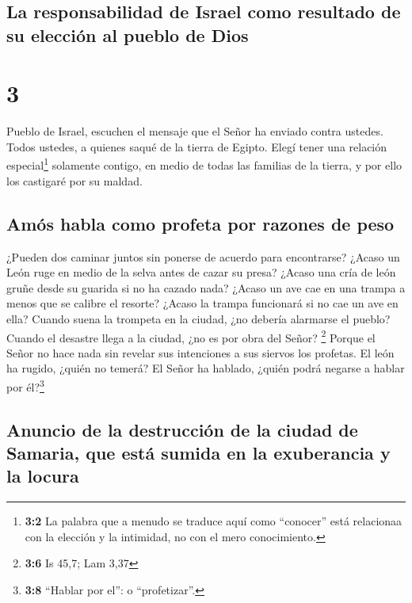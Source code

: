 \hypertarget{la-responsabilidad-de-israel-como-resultado-de-su-elecciuxf3n-al-pueblo-de-dios}{%
\subsection{La responsabilidad de Israel como resultado de su elección
al pueblo de
Dios}\label{la-responsabilidad-de-israel-como-resultado-de-su-elecciuxf3n-al-pueblo-de-dios}}

\hypertarget{section-2}{%
\section{3}\label{section-2}}

 Pueblo de Israel, escuchen el mensaje que el Señor ha
enviado contra ustedes. Todos ustedes, a quienes saqué de la tierra de
Egipto.  Elegí tener una relación especial\footnote{\textbf{3:2}
  La palabra que a menudo se traduce aquí como ``conocer'' está
  relacionaa con la elección y la intimidad, no con el mero
  conocimiento.} solamente contigo, en medio de todas las familias de la
tierra, y por ello los castigaré por su maldad.

\hypertarget{amuxf3s-habla-como-profeta-por-razones-de-peso}{%
\subsection{Amós habla como profeta por razones de
peso}\label{amuxf3s-habla-como-profeta-por-razones-de-peso}}

 ¿Pueden dos caminar juntos sin ponerse de acuerdo para
encontrarse?  ¿Acaso un León ruge en medio de la selva
antes de cazar su presa? ¿Acaso una cría de león gruñe desde su guarida
si no ha cazado nada?  ¿Acaso un ave cae en una trampa a
menos que se calibre el resorte? ¿Acaso la trampa funcionará si no cae
un ave en ella?  Cuando suena la trompeta en la ciudad,
¿no debería alarmarse el pueblo? Cuando el desastre llega a la ciudad,
¿no es por obra del Señor? \footnote{\textbf{3:6} Is 45,7; Lam 3,37}
 Porque el Señor no hace nada sin revelar sus intenciones
a sus siervos los profetas.  El león ha rugido, ¿quién no
temerá? El Señor ha hablado, ¿quién podrá negarse a hablar por
él?\footnote{\textbf{3:8} ``Hablar por el'': o ``profetizar''.}

\hypertarget{anuncio-de-la-destrucciuxf3n-de-la-ciudad-de-samaria-que-estuxe1-sumida-en-la-exuberancia-y-la-locura}{%
\subsection{Anuncio de la destrucción de la ciudad de Samaria, que está
sumida en la exuberancia y la
locura}\label{anuncio-de-la-destrucciuxf3n-de-la-ciudad-de-samaria-que-estuxe1-sumida-en-la-exuberancia-y-la-locura}}

